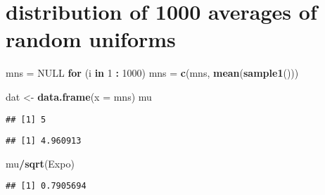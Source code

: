 \documentclass[]{article}
\newenvironment{Shaded}{\begin{snugshade}}{\end{snugshade}}
\newcommand{\KeywordTok}[1]{\textcolor[rgb]{0.13,0.29,0.53}{\textbf{#1}}}
\newcommand{\DataTypeTok}[1]{\textcolor[rgb]{0.13,0.29,0.53}{#1}}
\newcommand{\DecValTok}[1]{\textcolor[rgb]{0.00,0.00,0.81}{#1}}
\newcommand{\StringTok}[1]{\textcolor[rgb]{0.31,0.60,0.02}{#1}}
\newcommand{\OtherTok}[1]{\textcolor[rgb]{0.56,0.35,0.01}{#1}}
\newcommand{\ControlFlowTok}[1]{\textcolor[rgb]{0.13,0.29,0.53}{\textbf{#1}}}
\newcommand{\OperatorTok}[1]{\textcolor[rgb]{0.81,0.36,0.00}{\textbf{#1}}}
\newcommand{\NormalTok}[1]{#1}
\begin{document}
\section{distribution of 1000 averages of random
uniforms}\label{distribution-of-1000-averages-of-random-uniforms}

\begin{Shaded}
\begin{Highlighting}[]
\NormalTok{mns =}\StringTok{ }\OtherTok{NULL}
\ControlFlowTok{for}\NormalTok{ (i }\ControlFlowTok{in} \DecValTok{1} \OperatorTok{:}\StringTok{ }\DecValTok{1000}\NormalTok{) mns =}\StringTok{ }\KeywordTok{c}\NormalTok{(mns, }\KeywordTok{mean}\NormalTok{(}\KeywordTok{sample1}\NormalTok{()))}
\end{Highlighting}
\end{Shaded}

\begin{Shaded}
\begin{Highlighting}[]
\NormalTok{dat <-}\StringTok{ }\KeywordTok{data.frame}\NormalTok{(}\DataTypeTok{x =}\NormalTok{ mns)}
\NormalTok{mu}
\end{Highlighting}
\end{Shaded}

\begin{verbatim}
## [1] 5
\end{verbatim}

\begin{Shaded}
\end{Shaded}

\begin{verbatim}
## [1] 4.960913
\end{verbatim}

\begin{Shaded}
\begin{Highlighting}[]
\NormalTok{mu}\OperatorTok{/}\KeywordTok{sqrt}\NormalTok{(Expo)}
\end{Highlighting}
\end{Shaded}

\begin{verbatim}
## [1] 0.7905694
\end{verbatim}

\begin{Shaded}
\end{Shaded}
\end{document}
